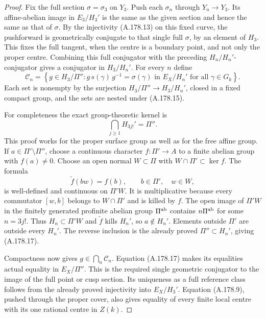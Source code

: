\begin{proof}
Fix the full section \(\sigma=\sigma_3\) on \(Y_3\).
Push each \(\sigma_n\) through \(Y_n\to Y_3\).
Its affine-abelian image in \(E_3/H_3'\) is the same as
the given section and hence the same as that of \(\sigma\).
By the injectivity (A.178.13) on this fixed curve, the
pushforward is geometrically conjugate to that single
full \(\sigma\), by an element of \(H_3\).  This fixes
the full tangent, when the centre is a boundary point,
and not only the proper centre.
Combining this full conjugator with the preceding
\(H_n/H_n'\)-conjugator gives a conjugator in
\(H_3/H_n'\).  For every \(n\) define
\[
 \mathcal C_n=
 \left\{g\in H_3/\Pi'':
       g\,s(\gamma)\,g^{-1}=\sigma(\gamma)
       \text{ in }E_X/H_n'
                  \text{ for all }\gamma\in G_k\right\}.
\tag{A.178.16}
\]
Each set is nonempty by the surjection
\(H_3/\Pi''\to H_3/H_n'\), closed in a fixed compact
group, and the sets are nested under (A.178.15).

For completeness the exact group-theoretic kernel is
\[
                          \bigcap_{j\ge1}H_{3j!}'=\Pi''.
\tag{A.178.17}
\]
This proof works for the proper surface group as well as
for the free affine group.  If \(a\in\Pi'\setminus\Pi''\),
choose a continuous character \(f:\Pi'\to A\) to a finite
abelian group with \(f(a)\ne0\).  Choose an open normal
\(W\subset\Pi\) with \(W\cap\Pi'\subset\ker f\).
The formula
\[
                     \widetilde f(bw)=f(b),
                      \qquad b\in\Pi',\quad w\in W,
\tag{A.178.18}
\]
is well-defined and continuous on \(\Pi'W\).
It is multiplicative because every commutator
\([w,b]\) belongs to \(W\cap\Pi'\) and is killed by \(f\).
The open image of \(\Pi'W\) in the finitely generated
profinite abelian group \(\Pi^{\rm ab}\) contains
\(n\Pi^{\rm ab}\) for some \(n=3j!\).
Thus \(H_n\subset\Pi'W\) and \(\widetilde f\) kills
\(H_n'\), so \(a\notin H_n'\).
Elements outside \(\Pi'\) are outside every \(H_n'\).
The reverse inclusion is the already proved
\(\Pi''\subset H_n'\), giving (A.178.17).

Compactness now gives \(g\in\bigcap_n\mathcal C_n\).
Equation (A.178.17) makes its equalities actual equality
in \(E_X/\Pi''\).  This is the required single geometric
conjugator to the image of the full point or cusp section.
Its uniqueness as a full reference class follows from
the already proved injectivity into \(E_X/H_3'\).
Equation (A.178.9), pushed through the proper cover,
also gives equality of every finite local centre with
its one rational centre in \(Z(k)\).


\end{proof}
